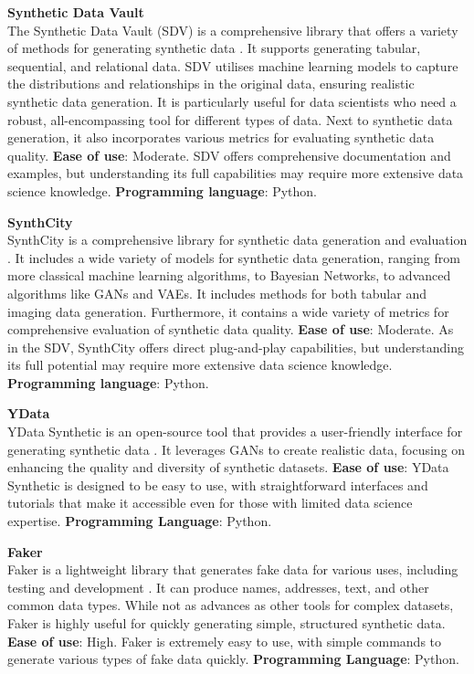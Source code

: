 \textbf{Synthetic Data Vault} \\
The Synthetic Data Vault (SDV) is a comprehensive library that offers a variety of methods for generating synthetic data \cite{patki2016synthetic}. It supports generating tabular, sequential, and relational data. SDV utilises machine learning models to capture the distributions and relationships in the original data, ensuring realistic synthetic data generation. It is particularly useful for data scientists who need a robust, all-encompassing tool for different types of data. Next to synthetic data generation, it also incorporates various metrics for evaluating synthetic data quality. \textbf{Ease of use}: Moderate. SDV offers comprehensive documentation and examples, but understanding its full capabilities may require more extensive data science knowledge. \textbf{Programming language}: Python. 

\textbf{SynthCity} \\
SynthCity is a comprehensive library for synthetic data generation and evaluation \cite{qian2024synthcity}. It includes a wide variety of models for synthetic data generation, ranging from more classical machine learning algorithms, to Bayesian Networks, to advanced algorithms like GANs and VAEs. It includes methods for both tabular and imaging data generation. Furthermore, it contains a wide variety of metrics for comprehensive evaluation of synthetic data quality. \textbf{Ease of use}: Moderate. As in the SDV, SynthCity offers direct plug-and-play capabilities, but understanding its full potential may require more extensive data science knowledge. \textbf{Programming language}: Python. 

\textbf{YData} \\
YData Synthetic is an open-source tool that provides a user-friendly interface for generating synthetic data \cite{ydata}. It leverages GANs to create realistic data, focusing on enhancing the quality and diversity of synthetic datasets. \textbf{Ease of use}: YData Synthetic is designed to be easy to use, with straightforward interfaces and tutorials that make it accessible even for those with limited data science expertise. \textbf{Programming Language}: Python.

\textbf{Faker}\\
Faker is a lightweight library that generates fake data for various uses, including testing and development \cite{faker}. It can produce names, addresses, text, and other common data types. While not as advances as other tools for complex datasets, Faker is highly useful for quickly generating simple, structured synthetic data. \textbf{Ease of use}: High. Faker is extremely easy to use, with simple commands to generate various types of fake data quickly. \textbf{Programming Language}: Python. 

